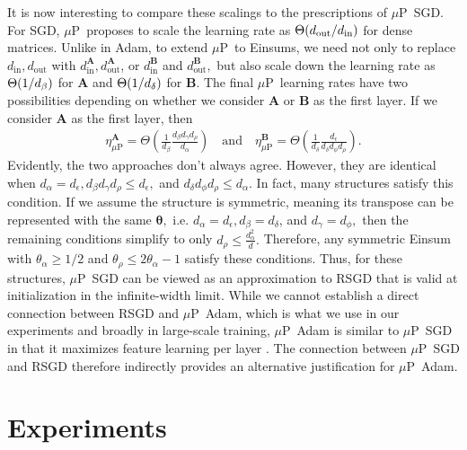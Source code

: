 \documentclass{article}
\newcommand{\mbf}[1]{{\boldsymbol{\mathbf{#1}}}}
\newcommand{\bm}{\mbf}
\newcommand{\din}{{d_\mathrm{in}}}
\newcommand{\dout}{{d_\mathrm{out}}}
\newcommand{\mup}{$\mu$P}
\renewcommand{\order}[1]{\Theta\qty(#1)}
\begin{document}
It is now interesting to compare these scalings to the prescriptions of \mup\ SGD. For SGD, \mup\ proposes to scale the learning rate as $\order{\dout/\din}$ \citep{yang2023spectral} for dense matrices. Unlike in Adam, to extend \mup\ to Einsums, we need not only to replace $\din, \dout$ with $d_{\text{in}}^{\bm{A}}, d_{\text{out}}^{\bm{A}}$, or $d_{\text{in}}^{\bm{B}}$ and $d_{\text{out}}^{\bm{B}},$ but also scale down the learning rate as $\order{1/d_\beta}$ for $\bm{A}$ and $\order{1/d_\delta}$ for $\bm{B}.$ The final \mup\ learning rates have two possibilities depending on whether we consider $\bm{A}$ or $\bm{B}$ as the first layer. If we consider $\bm{A}$ as the first layer, then
\begin{equation*}
    \begin{split}
      \eta^{\bm{A}}_{\mu\text{P}}
      =
      \Theta
      \left(\frac{1}{d_{\beta}} \frac{d_{\beta} d_{\gamma} d_{\rho}}{d_{\alpha}}\right)
      \quad \text{and} \quad
      \eta^{\bm{B}}_{\mu\text{P}}
      =
      \Theta\left(\frac{1}{d_{\delta}} \frac{d_{\epsilon}}{d_{\delta} d_{\phi} d_{\rho}}\right)
      .
    \end{split}
\end{equation*}
Evidently, the two approaches don't always agree. However, they are identical when $d_\alpha = d_\epsilon, d_\beta d_\gamma d_\rho \leq d_\epsilon,$ and $d_\delta d_\phi d_\rho \leq d_\alpha.$ In fact, many structures satisfy this condition. If we assume the structure is symmetric, meaning its transpose can be represented with the same $\bm{\theta},$ i.e. $d_\alpha=d_\epsilon, d_\beta = d_\delta$, and $d_\gamma = d_\phi,$ then the remaining conditions simplify to only $d_\rho \leq \frac{d^2_\alpha}{d}.$ Therefore, any symmetric Einsum with $\theta_\alpha \geq 1/2$ and $\theta_\rho \leq 2\theta_\alpha - 1$ satisfy these conditions.
Thus, for these structures, \mup\ SGD can be viewed as an approximation to RSGD that is valid at initialization in the infinite-width limit. While we cannot establish a direct connection between RSGD and \mup\ Adam, which is what we use in our experiments and broadly in large-scale training, \mup\ Adam is similar to \mup\ SGD in that it maximizes feature learning per layer \citep{yang2023iv}.
The connection between \mup\ SGD and RSGD therefore indirectly provides an alternative justification for \mup\ Adam.

\section{Experiments} \label{app:more_experiments}
\end{document}
